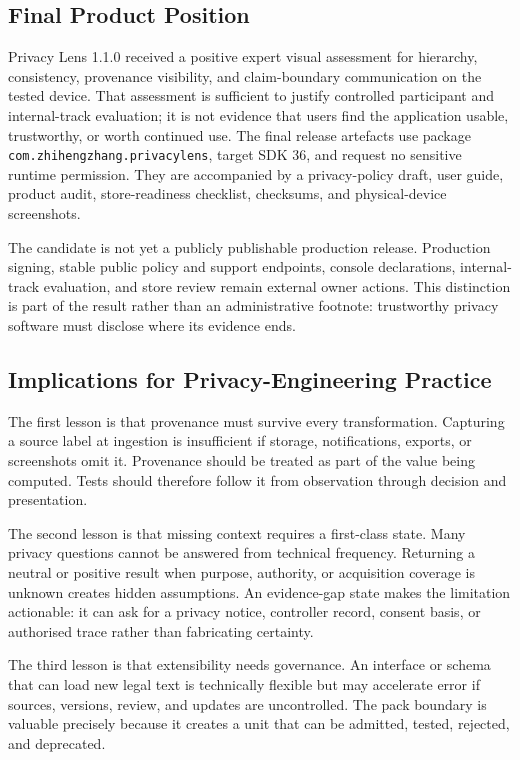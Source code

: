\subsection{Final Product Position}

Privacy Lens 1.1.0 received a positive expert visual assessment for hierarchy, consistency, provenance visibility, and claim-boundary communication on the tested device. That assessment is sufficient to justify controlled participant and internal-track evaluation; it is not evidence that users find the application usable, trustworthy, or worth continued use. The final release artefacts use package \texttt{com.zhihengzhang.privacylens}, target SDK 36, and request no sensitive runtime permission. They are accompanied by a privacy-policy draft, user guide, product audit, store-readiness checklist, checksums, and physical-device screenshots.

The candidate is not yet a publicly publishable production release. Production signing, stable public policy and support endpoints, console declarations, internal-track evaluation, and store review remain external owner actions. This distinction is part of the result rather than an administrative footnote: trustworthy privacy software must disclose where its evidence ends.

\subsection{Implications for Privacy-Engineering Practice}

The first lesson is that provenance must survive every transformation. Capturing a source label at ingestion is insufficient if storage, notifications, exports, or screenshots omit it. Provenance should be treated as part of the value being computed. Tests should therefore follow it from observation through decision and presentation.

The second lesson is that missing context requires a first-class state. Many privacy questions cannot be answered from technical frequency. Returning a neutral or positive result when purpose, authority, or acquisition coverage is unknown creates hidden assumptions. An evidence-gap state makes the limitation actionable: it can ask for a privacy notice, controller record, consent basis, or authorised trace rather than fabricating certainty.

The third lesson is that extensibility needs governance. An interface or schema that can load new legal text is technically flexible but may accelerate error if sources, versions, review, and updates are uncontrolled. The pack boundary is valuable precisely because it creates a unit that can be admitted, tested, rejected, and deprecated.

